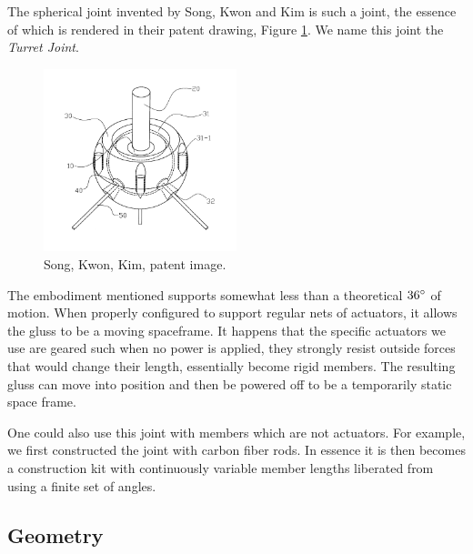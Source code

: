 \documentclass[11pt]{article}
\begin{document}
The spherical joint invented by Song, Kwon and Kim \cite{song2003spherical} is such a joint,
the essence of which is rendered in their patent drawing, Figure \ref{SongKwonKimImage}.
We name this joint the \emph{Turret Joint}.

\begin{figure}[!ht]
  \centering
    \includegraphics[width=0.5\textwidth]{SongKwonKimImage.png}
    \caption[Song, Kwon, Kim, patent image.]{Song, Kwon, Kim, patent image.}
      \label{SongKwonKimImage}
\end{figure}

The embodiment mentioned supports somewhat less than a theoretical
$36\degree$ of motion.
When properly configured to support regular nets of actuators,
it allows the gluss to be a moving spaceframe. It happens that the specific actuators we use
are geared such when no power is applied, they strongly resist outside forces that would change their length,
essentially become rigid members.
The resulting gluss
can move into position and then be powered off to be a temporarily static space frame.

One could also use this joint with members which are not actuators. For example, we first
constructed the joint with carbon fiber rods. In essence it is then becomes a construction kit with continuously
variable member lengths liberated from using a finite set of angles.

\subsection{Geometry}
\end{document}
